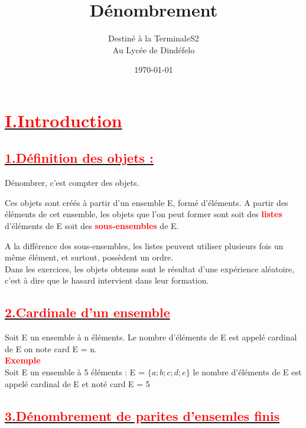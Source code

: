 \documentclass[12pt]{article}
\author{Destiné à la TerminaleS2\\Au Lycée de Dindéfelo}
\title{\textbf{Dénombrement}}
\date{\today}
\begin{document}
\maketitle
\newpage
\section*{\underline{\textbf{\textcolor{red}{I.Introduction}}}}
\subsection*{\underline{\textbf{\textcolor{red}{1.Définition des objets :}}}}
Dénombrer, c’est compter des objets.

Ces objets sont créés à partir d’un ensemble E, formé d’éléments.
A partir des éléments de cet ensemble, les objets que l’on peut former sont soit des 
\textbf{\textcolor{red}{listes}}
d’éléments de E soit des \textbf{\textcolor{red}{sous-ensembles}} de E.

A la différence des sous-ensembles,
les listes peuvent utiliser plusieurs fois un même élément, et surtout, possèdent un ordre.\\
Dans les exercices, les objets obtenus sont le résultat d’une expérience aléatoire, c’est à dire que le hasard intervient dans leur formation.\\


\subsection*{\underline{\textbf{\textcolor{red}{2.Cardinale d'un ensemble}}}}
Soit E un ensemble à n éléments.
Le nombre d’éléments de E est appelé cardinal de E on note card E = n.\\
\textbf{\textcolor{red}{Exemple}}\\
Soit E un ensemble à 5 éléments : E = $\lbrace a ; b ; c ; d ; e \rbrace$
le nombre d’éléments de E est appelé cardinal de E et noté card E = 5
\subsection*{\underline{\textbf{\textcolor{red}{3.Dénombrement de parites d'ensemles finis}}}}
\end{document}
